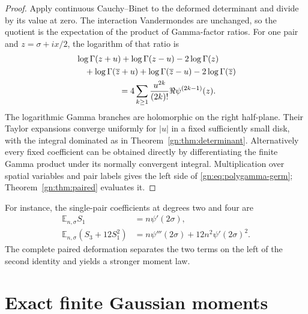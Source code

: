 \begin{proof}
Apply continuous Cauchy--Binet to the deformed determinant and divide
by its value at zero.  The interaction Vandermondes are unchanged, so
the quotient is the expectation of the product of Gamma-factor ratios.
For one pair and $z=\sigma+ix/2$, the logarithm of that ratio is
\[
\begin{aligned}
 &\log\Gamma(z+u)+\log\Gamma(z-u)-2\log\Gamma(z)\\
 &\quad+\log\Gamma(\overline z+u)+\log\Gamma(\overline z-u)
                         -2\log\Gamma(\overline z)\\
 &\hspace{18mm}=4\sum_{k\ge1}\frac{u^{2k}}{(2k)!}
                                      \Re\psi^{(2k-1)}(z).
\end{aligned}
\]
The logarithmic Gamma branches are holomorphic on the right half-plane.
Their Taylor expansions converge uniformly for $|u|$ in a fixed
sufficiently small disk, with the integral dominated as in
Theorem~\ref{gn:thm:determinant}.  Alternatively every fixed coefficient
can be obtained directly by differentiating the finite Gamma product
under its normally convergent integral.  Multiplication over spatial
variables and pair labels gives the left side of
\eqref{gn:eq:polygamma-germ}; Theorem~\ref{gn:thm:paired} evaluates it.
\end{proof}

For instance, the single-pair coefficients at degrees two and four are
\begin{align}
 \mathbb E_{n,\sigma}S_1
      &=n\psi'(2\sigma),\label{gn:eq:S1-mean}\\
 \mathbb E_{n,\sigma}(S_3+12S_1^2)
      &=n\psi'''(2\sigma)+12n^2\psi'(2\sigma)^2.
          \label{gn:eq:fourth-insertion}
\end{align}
The complete paired deformation separates the two terms on the left
of the second identity and yields a stronger moment law.

\section{Exact finite Gaussian moments}
\label{gn:sec:gaussian}

